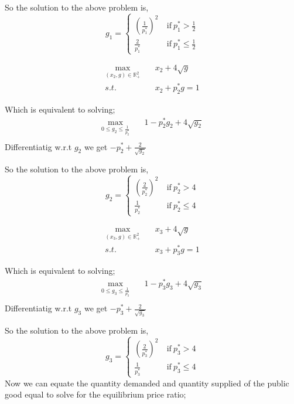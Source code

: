 \documentclass[12pt,a4paper,fleqn]{article}
\begin{document}
So the solution to the above problem is,
\begin{equation*}
    g_{1} = \begin{cases} {\left( \frac{1}{p_{1}^*} \right)}^{2} & \ \text{if} \ p_{1}^* > \frac{1}{2}\\
        \frac{2}{p_{1}^*} & \ \text{if} \ p_{1}^* \leq \frac{1}{2} 
    \end{cases}
\end{equation*}     
\begin{tcolorbox}
    \begin{align*}
          \max_{(x_{2},g)\in \mathbb{R}^{2}_{+}} & \quad x_{2} + 4\sqrt{g} \\
          s.t. & \quad x_{2} + p_{2}^* g =1
   \end{align*}
\end{tcolorbox}
Which is equivalent to solving;
\begin{align*}
       \max_{0 \leq g_{2} \leq \frac{1}{p_{2}^*}} & \quad 1-p_{2}^*g_{2} + 4\sqrt{g_{2}} \\
\end{align*}
Differentiatig w.r.t \(g_{2}\)  we get \(-p_{2}^* + \frac{2}{\sqrt{g_{2}}}\)  

So the solution to the above problem is,
\begin{equation*}
    g_{2} = \begin{cases} {\left( \frac{2}{p_{2}^*} \right)}^{2} & \ \text{if} \ p_{2}^* > 4\\
        \frac{1}{p_{2}^*} & \ \text{if} \ p_{2}^* \leq 4
    \end{cases}
\end{equation*}    
\begin{tcolorbox}
    \begin{align*}
          \max_{(x_{3},g)\in \mathbb{R}^{2}_{+}} & \quad x_{3} + 4\sqrt{g} \\
          s.t. & \quad x_{3} + p_{3}^* g =1
   \end{align*}
\end{tcolorbox}
Which is equivalent to solving;
\begin{align*}
       \max_{0 \leq g_{3} \leq \frac{1}{p_{3}^*}} & \quad 1-p_{3}^*g_{3} + 4\sqrt{g_{3}} \\
\end{align*}
Differentiatig w.r.t \(g_{3}\)  we get \(-p_{3}^* + \frac{2}{\sqrt{g_{3}}}\)  

So the solution to the above problem is,
\begin{equation*}
    g_{3} = \begin{cases} {\left( \frac{2}{p_{3}^*} \right)}^{2} & \ \text{if} \ p_{3}^* > 4\\
        \frac{1}{p_{3}^*} & \ \text{if} \ p_{3}^* \leq 4
    \end{cases}
\end{equation*} 
Now we can equate the quantity demanded and quantity supplied of the public good equal to solve for the equilibrium price ratio;
\end{document}
